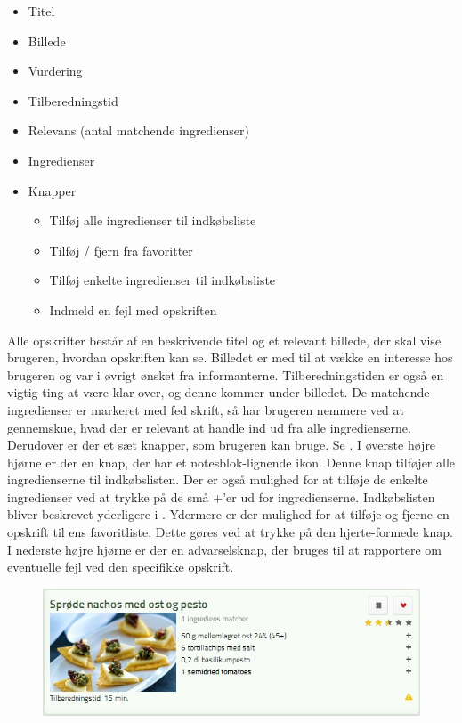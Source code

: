 \begin{itemize}[noitemsep]
  \item Titel
  \item Billede
  \item Vurdering
  \item Tilberedningstid
  \item Relevans (antal matchende ingredienser)
  \item Ingredienser
  \item Knapper
    \begin{itemize}[noitemsep]
      \item Tilføj alle ingredienser til indkøbsliste
      \item Tilføj / fjern fra favoritter
      \item Tilføj enkelte ingredienser til indkøbsliste
      \item Indmeld en fejl med opskriften
    \end{itemize}
\end{itemize}

Alle opskrifter består af en beskrivende titel og et relevant billede, der skal vise brugeren, hvordan opskriften kan se. Billedet er med til at vække en interesse hos brugeren og var i øvrigt ønsket fra informanterne. Tilberedningstiden er også en vigtig ting at være klar over, og denne kommer under billedet. De matchende ingredienser er markeret med fed skrift, så har brugeren nemmere ved at gennemskue, hvad der \fx er relevant at handle ind ud fra alle ingredienserne. Derudover er der et sæt knapper, som brugeren kan bruge. Se . I øverste højre hjørne er der en knap, der har et notesblok-lignende ikon. Denne knap tilføjer alle ingredienserne til indkøbslisten. Der er også mulighed for at tilføje de enkelte ingredienser ved at trykke på de små +'er ud for ingredienserne. Indkøbslisten bliver beskrevet yderligere i . 
Ydermere er der mulighed for at tilføje og fjerne en opskrift til ens favoritliste. Dette gøres ved at trykke på den hjerte-formede knap. I nederste højre hjørne er der en advarselsknap, der bruges til at rapportere om eventuelle fejl ved den specifikke opskrift.

\begin{figure}[ht]
	\centering
	\includegraphics[scale=0.7]{billeder/foodl/opskrift.jpg}
	\label{fig:foodl-opskrift}
\end{figure}

